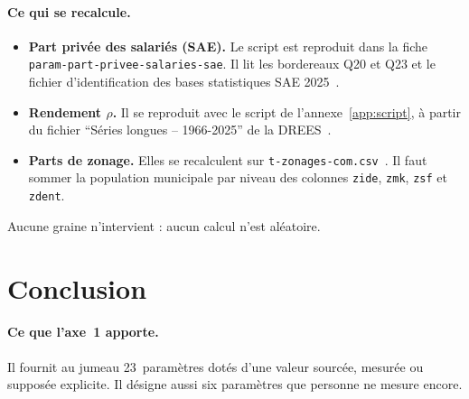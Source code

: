 \documentclass[11pt]{article}
\begin{document}
\paragraph{Ce qui se recalcule.}
\begin{itemize}
\item \textbf{Part privée des salariés (SAE).} Le script est reproduit
  dans la fiche \texttt{param-part-privee-salaries-sae}. Il lit les
  bordereaux Q20 et Q23 et le fichier d'identification des bases
  statistiques SAE 2025~\cite{sae708}.
\item \textbf{Rendement $\rho$.} Il se
  reproduit avec le script de l'annexe~\ref{app:script}, à partir du
  fichier \enquote{Séries longues -- 1966-2025} de la DREES~\cite{drees491}.
\item \textbf{Parts de zonage.} Elles se recalculent sur
  \texttt{t-zonages-com.csv}~\cite{zonagesdatagouv}. Il faut sommer la
  population municipale par niveau des colonnes \texttt{zide},
  \texttt{zmk}, \texttt{zsf} et \texttt{zdent}.
\end{itemize}
Aucune graine n'intervient : aucun calcul n'est aléatoire.

\section{Conclusion}

\paragraph{Ce que l'axe~1 apporte.}
Il fournit au jumeau 23~paramètres dotés d'une valeur sourcée, mesurée ou
supposée explicite. Il désigne aussi six paramètres que personne ne mesure
encore.
\end{document}
